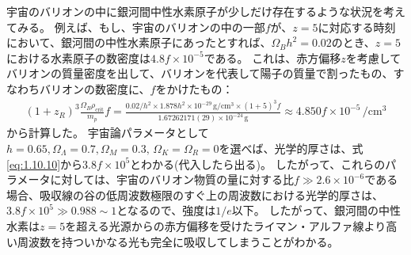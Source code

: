 \documentclass[11pt]{ltjsarticle}
\theoremstyle{plain}
\theoremstyle{break}
\begin{document}
宇宙のバリオンの中に銀河間中性水素原子が少しだけ存在するような状況を考えてみる。
例えば、もし、宇宙のバリオンの中の一部$f$が、$z=5$に対応する時刻において、銀河間の中性水素原子にあったとすれば、$\Omega_{B} h^{2}=0.02$のとき、$z = 5$における水素原子の数密度は$4.8 f \times 10^{-5}$である。
これは、赤方偏移$z$を考慮してバリオンの質量密度を出して、バリオンを代表して陽子の質量で割ったもの、すなわちバリオンの数密度に、$f$をかけたもの：
\begin{align}
(1+z_R)^3  \frac{\Omega_{B} \rho_{\text{crit}}}{m_p} f 
   = \frac{0.02/h^2 \times 1.878h^2 \times 10^{-29} \, \mathrm{g/cm^3} \times (1+5)^3 f}{1.67262171(29) \times 10^{-24} \,\mathrm{g}} \approx 4.850 f  \times 10^{-5} \, \mathrm{/cm^3}
\end{align}%
から計算した。
宇宙論パラメータとして$h=0.65, \Omega_{\Lambda}=0.7, \Omega_{M}=0.3, \, \Omega_{K}=\Omega_{R}=0$を選べば、光学的厚さは、式\eqref{eq:1.10.10}から$3.8 f \times 10^{5} $とわかる(代入したら出る)。
したがって、これらのパラメータに対しては、宇宙のバリオン物質の量に対する比$f \gg 2.6 \times 10^{-6}$である場合、吸収線の谷の低周波数極限のすぐ上の周波数における光学的厚さは、$3.8 f\times 10^5 \gg 0.988 \sim 1$となるので、強度は$1/e$以下。
したがって、銀河間の中性水素は$z=5$を超える光源からの赤方偏移を受けたライマン・アルファ線より高い周波数を持ついかなる光も完全に吸収してしまうことがわかる。
\end{document}
